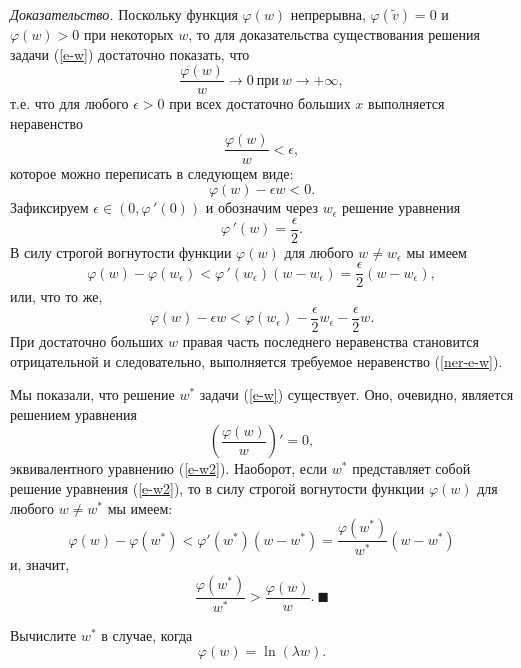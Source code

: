     \emph{Доказательство.} Поскольку функция $\varphi(w)$ непрерывна,
    $\varphi(\tilde{v})=0$ и $\varphi(w)>0$ при некоторых $w$, то для доказательства
    существования решения задачи (\ref{e-w}) достаточно показать,
    что
    \[\frac{\varphi(w)}{w}\rightarrow0 \ \text{при} \ w\rightarrow+\infty,\]
    т.е. что для любого $\epsilon>0$ при всех достаточно больших $x$
    выполняется неравенство
    \[\frac{\varphi(w)}{w}<\epsilon,\]
    которое можно переписать в следующем виде:
\begin{equation}
    \label{ner-e-w}
    \varphi(w)-\epsilon w<0.
\end{equation}
    Зафиксируем $\epsilon\in(0,\varphi\,'(0))$ и обозначим через
    $w_{\epsilon}$  решение уравнения
    \[\varphi\,'(w)=\frac{\epsilon}{2}.\]
    В силу строгой вогнутости функции $\varphi(w)$ для любого $w\neq w_{\epsilon}$ мы имеем
    \[\varphi(w)-\varphi(w_{\epsilon})<\varphi\,'(w_{\epsilon})(w-w_{\epsilon})
    =\frac{\epsilon}{2}(w-w_{\epsilon}),\]
    или, что то же,
    \[\varphi(w)-\epsilon w<\varphi(w_{\epsilon})
    -\frac{\epsilon}{2}w_{\epsilon}-\frac{\epsilon}{2}w.\]
    При достаточно больших $w$ правая часть последнего неравенства
    становится отрицательной и следовательно, выполняется требуемое
    неравенство (\ref{ner-e-w}).

    Мы показали, что решение $w^{*}$ задачи (\ref{e-w}) существует.
    Оно, очевидно, является решением уравнения
    \[\left(\frac{\varphi(w)}{w}\right)'=0,\]
    эквивалентного уравнению (\ref{e-w2}).
    Наоборот, если $w^{*}$ представляет собой решение уравнения
    (\ref{e-w2}), то в силу строгой вогнутости функции $\varphi(w)$ для любого
    $w\neq w^{*}$ мы имеем:
    \[\varphi(w)-\varphi(w^{*})<\varphi'(w^{*})(w-w^{*})=\frac{\varphi(w^{*})}{w^{*}}(w-w^{*})\]
    и, значит,
    \[\frac{\varphi(w^{*})}{w^{*}}>\frac{\varphi(w)}{w}. \ \blacksquare\]

\begin{exer}
    Вычислите $w^{*}$ в случае, когда
    \[\varphi(w)=\ln(\lambda w).\]
\end{exer}


